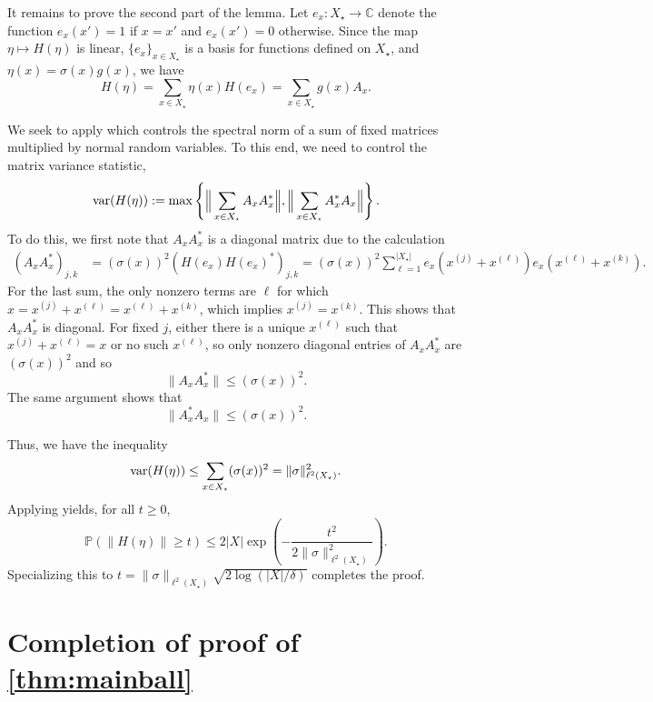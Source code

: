 \documentclass[11pt]{article}
\theoremstyle{definition}
\numberwithin{theorem}{section}
\numberwithin{lemma}{section}
\numberwithin{equation}{section}
\def\C{\mathbb{C}}
\def\P{\mathbb{P}}
\newcommand{\var}{{\rm var}}
\newcommand{\sampset}{X}
\numberwithin{equation}{section}
\begin{document}
		It remains to prove the second part of the lemma. Let $e_x\colon \sampset_\star\to \C$ denote the function $e_x(x')=1$ if $x=x'$ and $e_x(x')=0$ otherwise. Since the map $\eta\mapsto H(\eta)$ is linear, $\{e_x\}_{x\in \sampset_\star}$ is a basis for functions defined on $\sampset_\star$, and $\eta(x)=\sigma(x)g(x)$, we have
		$$
		H(\eta)
		=\sum_{x\in \sampset_\star} \eta(x) H(e_x)
		=\sum_{x\in \sampset_\star} g(x) A_x.
		$$ 
		
		We seek to apply \cite[Theorem 4.1.1]{tropp2015introduction} which controls the spectral norm of a sum of fixed matrices multiplied by normal random variables. To this end, we need to control the matrix variance statistic,
		$$
		\var(H(\eta)):= \max\left\{ \Big\| \sum_{x\in \sampset_\star} A_x A_x^* \Big\|, \Big\| \sum_{x\in \sampset_\star} A_x^* A_x \Big\| \right\}.
		$$
		To do this, we first note that $A_x A_x^*$ is a diagonal matrix due to the calculation
		\begin{align*}
			(A_x A_x^*)_{j,k}
			&= (\sigma(x))^2 (H(e_x)H(e_x)^*)_{j,k}
			= (\sigma(x))^2 \sum_{\ell=1}^{|\sampset_\star|} e_x\left(x^{(j)}+x^{(\ell)}\right) e_x\left(x^{(\ell)}+x^{(k)}\right).
		\end{align*}
		For the last sum, the only nonzero terms are $\ell$ for  which $x=x^{(j)}+x^{(\ell)}=x^{(\ell)}+x^{(k)}$, which implies $x^{(j)}=x^{(k)}$. This shows that $A_x A_x^*$ is diagonal. For fixed $j$, either there is a unique $x^{(\ell)}$ such that $x^{(j)}+x^{(\ell)}=x$ or no such $x^{(\ell)}$, so only nonzero diagonal entries of $A_x A_x^*$ are $(\sigma(x))^2$ and so 
		$$
		\|A_x A_x^*\|\leq (\sigma(x))^2.
		$$
		The same argument shows that
		$$
		\|A_x^* A_x\|\leq (\sigma(x))^2.
		$$
		
		Thus, we have the inequality 
		$$
		\var(H(\eta))
		\leq \sum_{x\in \sampset_\star} (\sigma(x))^2
		=\|\sigma\|_{\ell^2(\sampset_\star)}^2. 
		$$
		Applying \cite[Theorem 4.1.1]{tropp2015introduction} yields, for all $t\geq 0$,
		\begin{equation*}
			\P\left(\|H(\eta)\|\geq t\right)
			\leq 2 |\sampset| \exp\left(-\frac{t^2}{2\|\sigma\|_{\ell^2(\sampset_\star)}^2}\right). 
		\end{equation*}
		Specializing this to $t=\|\sigma\|_{\ell^2(\sampset_\star)} \sqrt{2 \log(|\sampset|/\delta)}$ completes the proof. 

	
	
	\section{Completion of proof of \cref{thm:mainball}}
	\label{sec:prooflemmas2}	
	\label{proof:mainball}
	
\end{document}

